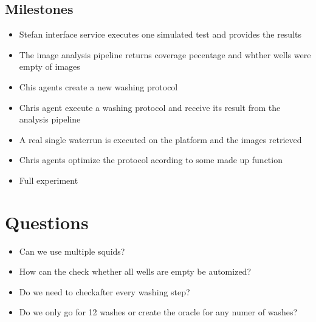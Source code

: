 \documentclass[a4paper,11pt]{article}
\begin{document}
\subsection{Milestones}
\begin{itemize}
    \item Stefan interface service executes one simulated test and provides the results
    \item The image analysis pipeline returns coverage pecentage and whther wells were empty of images
    \item Chis agents create a new washing protocol
    \item Chris agent execute a washing protocol and receive its result from the analysis pipeline
    \item A real single waterrun is executed on the platform and the images retrieved
    \item Chris agents optimize the protocol acording to some made up function
    \item Full experiment
\end{itemize}

\section{Questions}
\begin{itemize}
    \item Can we use multiple squids?
    \item How can the check whether all wells are empty be automized?
    \item Do we need to checkafter every washing step?
    \item Do we only go for 12 washes or create the oracle for any numer of washes?
\end{itemize}
\end{document}
